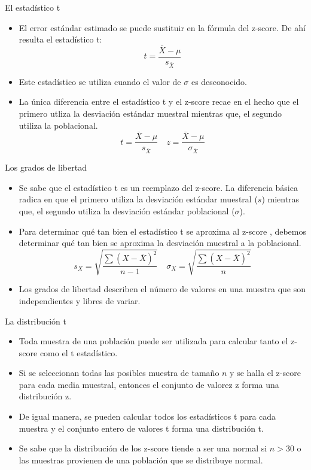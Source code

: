 \documentclass{beamer}
\begin{document}
	\begin{frame}{El estadístico t}
\begin{itemize}
\justifying
\item El error estándar estimado se puede sustituir en la fórmula del z-score. De ahí resulta el estadístico t:
$$t=\dfrac{\bar{X}-\mu}{s_{\bar{X}}}$$
\item Este estadístico se utiliza cuando el valor de $\sigma$ es desconocido. 
\item La única diferencia entre el estadístico t y el z-score recae en el hecho que el primero utliza la desviación estándar muestral mientras que, el segundo utiliza la poblacional.
$$t=\dfrac{\bar{X}-\mu}{s_{\bar{X}}} \quad z=\dfrac{\bar{X}-\mu}{\sigma_{\bar{X}}}$$
\end{itemize}
	\end{frame}
	
	\begin{frame}{Los grados de libertad}
\begin{itemize}
\justifying
\item Se sabe que el estadístico t es un reemplazo del z-score. La diferencia básica radica en que el primero utiliza la desviación estándar muestral ($s$) mientras que, el segundo utiliza la desviación estándar poblacional ($\sigma$).
\item Para determinar qué tan bien el estadístico t se aproxima al z-score , debemos determinar qué tan bien se aproxima la desviación muestral a la poblacional.
$$s_X=\sqrt{\dfrac{\sum{(X-\bar{X})^2}}{n-1}} \quad \sigma_X=\sqrt{\dfrac{\sum{(X-\bar{X})^2}}{n}}  $$ 
\item Los grados de libertad describen el número de valores en una muestra que son independientes y libres de variar.
\end{itemize}
	\end{frame}
	
		\begin{frame}{La distribución t}
			\begin{itemize}
				\justifying
\item Toda muestra de una población puede ser utilizada para calcular tanto el z-score como el t estadístico.
\item Si se seleccionan todas las posibles muestra de tamaño $n$ y se halla el z-score para cada media muestral, entonces el conjunto de valorez z forma una distribución z.
\item De igual manera, se pueden calcular todos los estadísticos t para cada muestra y el conjunto entero de valores  t forma una distribución t.
\item Se sabe que la distribución de los z-score tiende a ser una normal si $n>30$ o las muestras provienen de una población que se distribuye normal. 
			\end{itemize}
		\end{frame}
		
\end{document}
